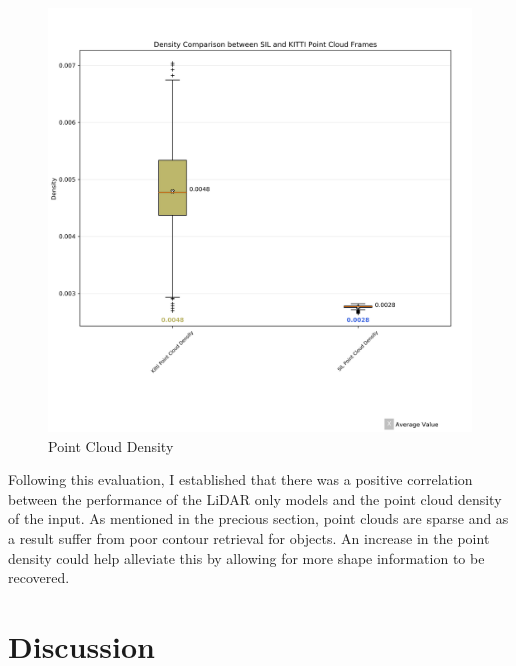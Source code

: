 \begin{figure}[H] %
	\centering
	\includegraphics[width=0.6\linewidth]{images/density}
	\caption{Point Cloud Density}
	\label{fig:density}
\end{figure}


Following this evaluation, I established that there was a positive correlation between the performance of the LiDAR only models and the point cloud density of the input. As mentioned in the precious section, point clouds are sparse and as a result suffer from poor contour retrieval for objects. An increase in the point density could help alleviate this by allowing for more shape information to be recovered.


\section{Discussion}

